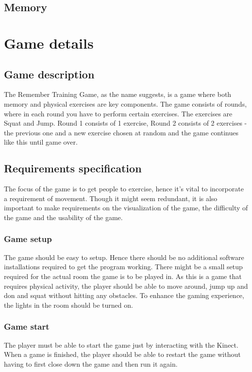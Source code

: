 \documentclass[11pt]{report}
\begin{document}
\section{Memory}


\chapter{Game details}
\section{Game description}
The Remember Training Game, as the name suggests, is a game where both memory and physical exercises are key components. The game consists of rounds, where in each round you have to perform certain exercises. The exercises are Squat and Jump. Round 1 consists of 1 exercise, Round 2 consists of 2 exercises - the previous one and a new exercise chosen at random and the game continues like this until game over.

\section{Requirements specification}
The focus of the game is to get people to exercise, hence it's vital to incorporate a requirement of movement. Though it might seem redundant, it is also important to make requirements on the visualization of the game, the difficulty of the game and the usability of the game.

\subsection{Game setup}
The game should be easy to setup. Hence there should be no additional software installations required to get the program working. There might be a small setup required for the actual room the game is to be played in. As this is a game that requires physical activity, the player should be able to move around, jump up and don and squat without hitting any obstacles. To enhance the gaming experience, the lights in the room should be turned on.

\subsection{Game start}
The player must be able to start the game just by interacting with the Kinect. When a game is finished, the player should be able to restart the game without having to first close down the game and then run it again.
\end{document}
